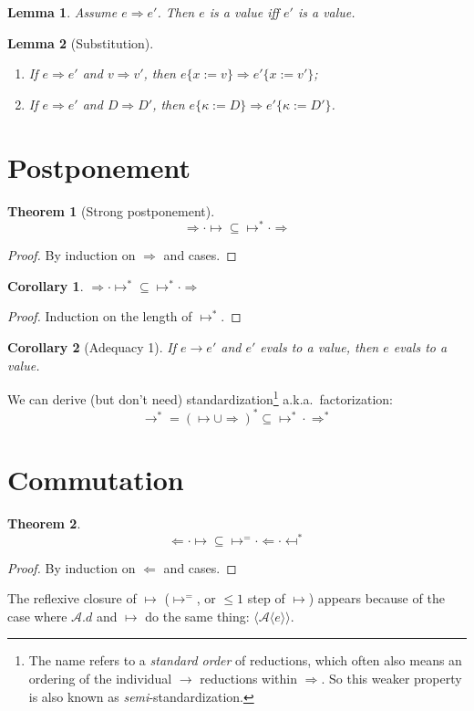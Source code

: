\documentclass[a4paper, 11pt,titlepage, openright, twoside]{report}
\newcommand{\Int}{\Rightarrow}
\newcommand{\Tni}{\Leftarrow}
\newcommand{\subst}[2]{\{#1{:=}#2\}}
\newcommand{\A}{\mathcal{A}}
\newcommand{\+}{\enspace}
\newtheorem{corollary}{Corollary}
\newtheorem{lemma}{Lemma}
\newtheorem{theorem}{Theorem}
\begin{document}
\begin{lemma} Assume $e \Int e'$. Then $e$ is a value iff $e'$ is a value.
\end{lemma}

\begin{lemma}[Substitution]
	\item
	\begin{enumerate}
		\item If $e \Int e'$ and $v \Int v'$, then $e\subst{x}{v} \Int e'\subst{x}{v'}$;
		\item If $e \Int e'$ and $D \Int D'$, then $e\subst{κ}{D} \Int e'\subst{κ}{D'}$.
	\end{enumerate}
\end{lemma}


\section{Postponement}

\begin{theorem}[Strong postponement]
	$${\Int · ↦} ⊆ {↦^* · \Int}$$
\end{theorem}
\begin{proof}
	By induction on $\Int$ and cases.
\end{proof}
\begin{corollary}
	${\Int · ↦^*} ⊆ {↦^* · \Int}$
\end{corollary}
\begin{proof}
	Induction on the length of $↦^*$.
\end{proof}
\begin{corollary}[Adequacy 1]
	If $e → e'$ and $e'$ evals to a value, then $e$ evals to a value.
\end{corollary}

We can derive (but don't need) standardization\footnote{
	The name refers to a \textit{standard order} of reductions,
	which often also means an ordering of the individual $→$ reductions within $\Int$.
	So this weaker property is also known as \textit{semi}-standardization.
} a.k.a.\ factorization:
$$→^* = (↦ ∪ \Int)^* ⊆ {↦^* · \Int^*}$$

\section{Commutation}

\begin{theorem}
 \label{quasisubcomm}
	$${\Tni · ↦ } ⊆ {↦^= · \Tni · \mapsfrom^*}$$
\end{theorem}
\begin{proof}
	By induction on $\Tni$ and cases.
\end{proof}
The reflexive closure of $↦$ ($↦^=$, or $≤1$ step of $↦$) appears because of the case
where $\A.d$ and $↦$ do the same thing: $⟨\A⟨e⟩⟩$.
\end{document}
